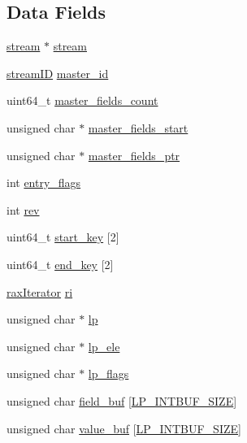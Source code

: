 \subsection*{Data Fields}
\begin{DoxyCompactItemize}
\item 
\hyperlink{structstream}{stream} $\ast$ \hyperlink{structstream_iterator_a2717a95048d12a63e9f346c876452cf5}{stream}
\item 
\hyperlink{structstream_i_d}{stream\+ID} \hyperlink{structstream_iterator_a22bc2bf87d69fa36f03f104dd4dc0ebd}{master\+\_\+id}
\item 
uint64\+\_\+t \hyperlink{structstream_iterator_a13c51379164df153b027ad5166a6cb1e}{master\+\_\+fields\+\_\+count}
\item 
unsigned char $\ast$ \hyperlink{structstream_iterator_a4830a00322f1940e11609c9fdcb64d56}{master\+\_\+fields\+\_\+start}
\item 
unsigned char $\ast$ \hyperlink{structstream_iterator_ad1a075c336637fc52e14b2d050bfb7e1}{master\+\_\+fields\+\_\+ptr}
\item 
int \hyperlink{structstream_iterator_a299478227bd853e88571fda299a4a278}{entry\+\_\+flags}
\item 
int \hyperlink{structstream_iterator_a20fe2570b7d9af1bccf81b5883bc932f}{rev}
\item 
uint64\+\_\+t \hyperlink{structstream_iterator_a957f81e750ff00c09ebdaeee08852842}{start\+\_\+key} \mbox{[}2\mbox{]}
\item 
uint64\+\_\+t \hyperlink{structstream_iterator_aabbe3cb630a9fb198624e92e8392ed64}{end\+\_\+key} \mbox{[}2\mbox{]}
\item 
\hyperlink{structrax_iterator}{rax\+Iterator} \hyperlink{structstream_iterator_abe7bb9f1992cb1fb3c1ecb28c13772a4}{ri}
\item 
unsigned char $\ast$ \hyperlink{structstream_iterator_a638eda6d25f4765df61c9dc78c909c28}{lp}
\item 
unsigned char $\ast$ \hyperlink{structstream_iterator_a00edb0a3b43d71d7cf4613a1e0cedacf}{lp\+\_\+ele}
\item 
unsigned char $\ast$ \hyperlink{structstream_iterator_aea0d250de80a4bd00be3132a1c5ae4d2}{lp\+\_\+flags}
\item 
unsigned char \hyperlink{structstream_iterator_a596933be22929d7953baa08f3c2cd307}{field\+\_\+buf} \mbox{[}\hyperlink{listpack_8h_ab31e5c173b595ae4e703b72eb435a6e9}{L\+P\+\_\+\+I\+N\+T\+B\+U\+F\+\_\+\+S\+I\+ZE}\mbox{]}
\item 
unsigned char \hyperlink{structstream_iterator_ad74997f09403d328cf170892bd5c3a2f}{value\+\_\+buf} \mbox{[}\hyperlink{listpack_8h_ab31e5c173b595ae4e703b72eb435a6e9}{L\+P\+\_\+\+I\+N\+T\+B\+U\+F\+\_\+\+S\+I\+ZE}\mbox{]}
\end{DoxyCompactItemize}


